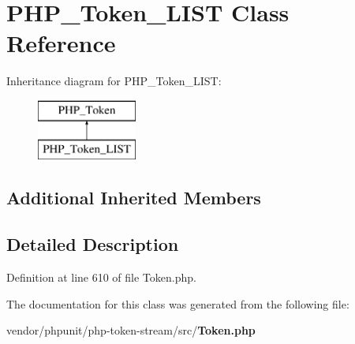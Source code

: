\section{P\+H\+P\+\_\+\+Token\+\_\+\+L\+I\+S\+T Class Reference}
\label{class_p_h_p___token___l_i_s_t}
Inheritance diagram for P\+H\+P\+\_\+\+Token\+\_\+\+L\+I\+S\+T\+:\begin{figure}[H]
\begin{center}
\leavevmode
\includegraphics[height=2.000000cm]{class_p_h_p___token___l_i_s_t}
\end{center}
\end{figure}
\subsection*{Additional Inherited Members}


\subsection{Detailed Description}


Definition at line 610 of file Token.\+php.



The documentation for this class was generated from the following file\+:\begin{DoxyCompactItemize}
\item 
vendor/phpunit/php-\/token-\/stream/src/{\bf Token.\+php}\end{DoxyCompactItemize}
